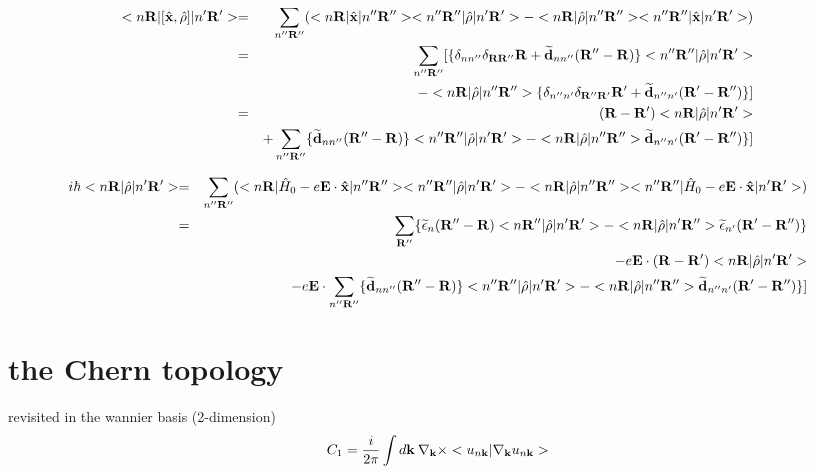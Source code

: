 \documentclass[aps,prb,preprint]{revtex4-1}
\begin{document}
\begin{appendix}
\begin{eqnarray}
 < n{\bf R}| [\hat{\bf x}, \hat{\rho} ]|n'{\bf R'}> = && \sum_{n''{\bf R''}} ( < n{\bf R}| \hat{\bf x}|n''{\bf R''}> < n''{\bf R''}|\hat{\rho} |n'{\bf R'}> -< n{\bf R}| \hat{\rho}|n''{\bf R''}> < n''{\bf R''}|\hat{\bf x} |n'{\bf R'}> ) \nonumber \\
 = && \sum_{n''{\bf R''}} [ \{ \delta_{nn''} \delta_{\bf RR''} {\bf R}  + {\bf \widetilde d}_{nn''}({\bf R''-R}) \} < n''{\bf R''}|\hat{\rho} |n'{\bf R'}> \nonumber \\
 &&-< n{\bf R}| \hat{\rho}|n''{\bf R''}> \{ \delta_{n''n'} \delta_{\bf R''R'} {\bf R'}  + {\bf \widetilde d}_{n''n'}({\bf R'-R''}) \} ] \nonumber \\
  = && ({\bf R-R'}) < n{\bf R}|\hat{\rho} |n'{\bf R'}>  \nonumber \\
  && + \sum_{n''{\bf R''}} \{ {\bf \widetilde d}_{nn''}({\bf R''-R}) \} < n''{\bf R''}|\hat{\rho} |n'{\bf R'}> -< n{\bf R}| \hat{\rho}|n''{\bf R''}> {\bf \widetilde d}_{n''n'}({\bf R'-R''}) \} ] \nonumber \\
\end{eqnarray} 

\begin{eqnarray}
 i \hbar < n{\bf R}| \hat{\rho} |n'{\bf R'}> = && \sum_{n''{\bf R''}} ( < n{\bf R}| \hat{H}_0 -e{\bf E} \cdot {\bf \hat{x}} |n''{\bf R''}> < n''{\bf R''}|\hat{\rho} |n'{\bf R'}> -< n{\bf R}| \hat{\rho}|n''{\bf R''}> < n''{\bf R''}|\hat{H}_0 -e{\bf E} \cdot {\bf \hat{x}} |n'{\bf R'}> ) \nonumber \\
 =&& \sum_{\bf R''} \{ \widetilde{\epsilon}_{n}({\bf R''- R} )  < n{\bf R''}|\hat{\rho} |n'{\bf R'}> - < n{\bf R}| \hat{\rho}|n'{\bf R''}> \widetilde{\epsilon}_{n'}({\bf R'- R''} )   \} \nonumber \\
 && -e{\bf E} \cdot ({\bf R-R'}) < n{\bf R}|\hat{\rho} |n'{\bf R'}>\nonumber \\
 && -e{\bf E} \cdot \sum_{n''{\bf R''}} \{ {\bf \widetilde d}_{nn''}({\bf R''-R}) \} < n''{\bf R''}|\hat{\rho} |n'{\bf R'}> -< n{\bf R}| \hat{\rho}|n''{\bf R''}> {\bf \widetilde d}_{n''n'}({\bf R'-R''}) \} ] \nonumber \\ 
\end{eqnarray} 

\section{the Chern topology}
revisited in the wannier basis (2-dimension)
\begin{eqnarray}
C_1 = \frac{i}{2\pi} \int d{\bf k} \: \nabla_{\bf k} \times <u_{n{\bf k}}|\nabla_{\bf k}u_{n{\bf k}}> \nonumber \\ 
\end{eqnarray} 


\end{appendix}
\end{document}
